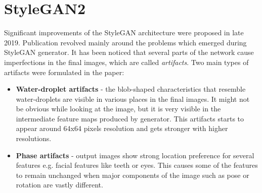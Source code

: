 \documentclass[12pt,a4paper,openany]{book}
\begin{document}





\section{StyleGAN2}

Significant improvements of the StyleGAN architecture were proposed in late 2019. Publication revolved mainly around the problems which emerged during StyleGAN generator. It has been noticed that several parts of the network cause imperfections in the final images, which are called \textit{artifacts}. Two main types of artifacts were formulated in the paper:

\begin{itemize}
\item \textbf{Water-droplet artifacts} - the blob-shaped characteristics that resemble water-droplets are visible in various places in the final images. It might not be obvious while looking at the image, but it is very visible in the intermediate feature maps produced by generator. This artifacts starts to appear around 64x64 pixels resolution and gets stronger with higher resolutions. 
\item \textbf{Phase artifacts} - output images show strong location preference for several features e.g. facial features like teeth or eyes. This causes some of the features to remain unchanged when major components of the image such as pose or rotation are vastly different.
\end{itemize}
\end{document}
